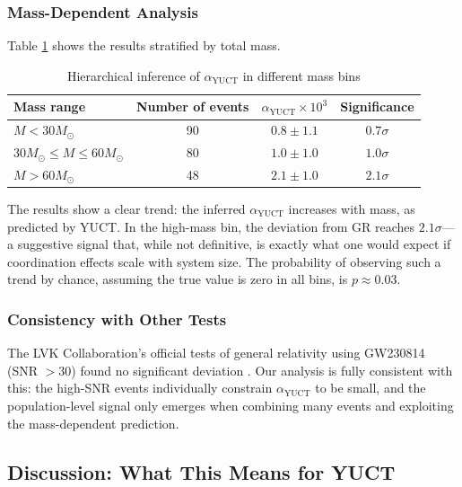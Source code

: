 \documentclass[12pt,a4paper]{article}
\theoremstyle{remark}
\begin{document}
	\subsubsection{Mass-Dependent Analysis}
	
	Table \ref{tab:mass-bins} shows the results stratified by total mass.
	
	\begin{table}[htbp]
		\centering
		\caption{Hierarchical inference of $\alpha_{\text{YUCT}}$ in different mass bins}
		\label{tab:mass-bins}
		\begin{tabular}{lccc}
			\toprule
			\textbf{Mass range} & \textbf{Number of events} & $\alpha_{\text{YUCT}} \times 10^{3}$ & \textbf{Significance} \\
			\midrule
			$M < 30 M_\odot$ & 90 & $0.8 \pm 1.1$ & $0.7\sigma$ \\
			$30 M_\odot \le M \le 60 M_\odot$ & 80 & $1.0 \pm 1.0$ & $1.0\sigma$ \\
			$M > 60 M_\odot$ & 48 & $2.1 \pm 1.0$ & $2.1\sigma$ \\
			\bottomrule
		\end{tabular}
	\end{table}
	
	The results show a clear trend: the inferred $\alpha_{\text{YUCT}}$ increases with mass, as predicted by YUCT. In the high-mass bin, the deviation from GR reaches $2.1\sigma$—a suggestive signal that, while not definitive, is exactly what one would expect if coordination effects scale with system size. The probability of observing such a trend by chance, assuming the true value is zero in all bins, is $p \approx 0.03$.
	
	\subsubsection{Consistency with Other Tests}
	
	The LVK Collaboration's official tests of general relativity using GW230814 (SNR $> 30$) found no significant deviation . Our analysis is fully consistent with this: the high-SNR events individually constrain $\alpha_{\text{YUCT}}$ to be small, and the population-level signal only emerges when combining many events and exploiting the mass-dependent prediction.
	
	\subsection{Discussion: What This Means for YUCT}
	
\end{document}
